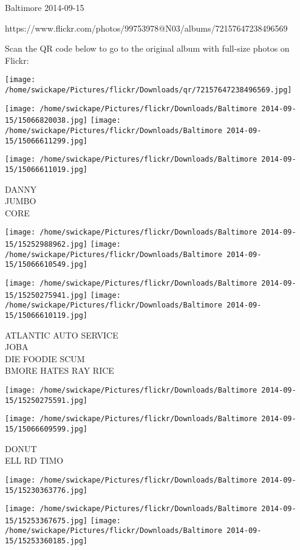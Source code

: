 \documentclass[10pt,letterpaper]{article}
\begin{document}
Baltimore 2014-09-15

https://www.flickr.com/photos/99753978@N03/albums/72157647238496569

Scan the QR code below to go to the original album with full-size photos on Flickr:

\texttt{[image: /home/swickape/Pictures/flickr/Downloads/qr/72157647238496569.jpg]}
\pagebreak

\texttt{[image: /home/swickape/Pictures/flickr/Downloads/Baltimore 2014-09-15/15066820038.jpg]}
\texttt{[image: /home/swickape/Pictures/flickr/Downloads/Baltimore 2014-09-15/15066611299.jpg]}

\vspace{0.25in}
\texttt{[image: /home/swickape/Pictures/flickr/Downloads/Baltimore 2014-09-15/15066611019.jpg]}

DANNY\\
JUMBO\\
CORE
\pagebreak

\texttt{[image: /home/swickape/Pictures/flickr/Downloads/Baltimore 2014-09-15/15252988962.jpg]}
\texttt{[image: /home/swickape/Pictures/flickr/Downloads/Baltimore 2014-09-15/15066610549.jpg]}

\texttt{[image: /home/swickape/Pictures/flickr/Downloads/Baltimore 2014-09-15/15250275941.jpg]}
\texttt{[image: /home/swickape/Pictures/flickr/Downloads/Baltimore 2014-09-15/15066610119.jpg]}

ATLANTIC AUTO SERVICE\\
JOBA\\
DIE FOODIE SCUM\\
BMORE HATES RAY RICE
\pagebreak

\texttt{[image: /home/swickape/Pictures/flickr/Downloads/Baltimore 2014-09-15/15250275591.jpg]}

\vspace{0.25in}
\texttt{[image: /home/swickape/Pictures/flickr/Downloads/Baltimore 2014-09-15/15066609599.jpg]}

DONUT\\
ELL RD TIMO
\pagebreak

\texttt{[image: /home/swickape/Pictures/flickr/Downloads/Baltimore 2014-09-15/15230363776.jpg]}

\vspace{0.25in}
\texttt{[image: /home/swickape/Pictures/flickr/Downloads/Baltimore 2014-09-15/15253367675.jpg]}
\texttt{[image: /home/swickape/Pictures/flickr/Downloads/Baltimore 2014-09-15/15253360185.jpg]}
\end{document}
